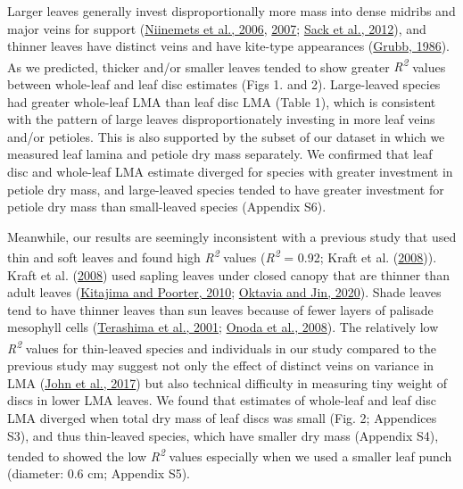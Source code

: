 \documentclass[
  12pt,
  a4paper,
,tablecaptionabove
]{scrartcl}
\begin{document}
Larger leaves generally invest disproportionally more mass into dense
midribs and major veins for support
(\protect\hyperlink{ref-Niinemets2006}{Niinemets et al., 2006},
\protect\hyperlink{ref-Niinemets2007}{2007};
\protect\hyperlink{ref-Sack2012}{Sack et al., 2012}), and thinner leaves
have distinct veins and have kite-type appearances
(\protect\hyperlink{ref-Grubb1986}{Grubb, 1986}). As we predicted,
thicker and/or smaller leaves tended to show greater
\emph{R\textsuperscript{2}} values between whole-leaf and leaf disc
estimates (Figs 1. and 2). Large-leaved species had greater whole-leaf
LMA than leaf disc LMA (Table 1), which is consistent with the pattern
of large leaves disproportionately investing in more leaf veins and/or
petioles. This is also supported by the subset of our dataset in which
we measured leaf lamina and petiole dry mass separately. We confirmed
that leaf disc and whole-leaf LMA estimate diverged for species with
greater investment in petiole dry mass, and large-leaved species tended
to have greater investment for petiole dry mass than small-leaved
species (Appendix S6).

Meanwhile, our results are seemingly inconsistent with a previous study
that used thin and soft leaves and found high
\emph{R\textsuperscript{2}} values (\emph{R\textsuperscript{2}} = 0.92;
Kraft et al. (\protect\hyperlink{ref-Kraft2008}{2008})). Kraft et al.
(\protect\hyperlink{ref-Kraft2008}{2008}) used sapling leaves under
closed canopy that are thinner than adult leaves
(\protect\hyperlink{ref-Kitajima2010}{Kitajima and Poorter, 2010};
\protect\hyperlink{ref-Oktavia2020}{Oktavia and Jin, 2020}). Shade
leaves tend to have thinner leaves than sun leaves because of fewer
layers of palisade mesophyll cells
(\protect\hyperlink{ref-Terashima2001}{Terashima et al., 2001};
\protect\hyperlink{ref-Onoda2008}{Onoda et al., 2008}). The relatively
low \emph{R\textsuperscript{2}} values for thin-leaved species and
individuals in our study compared to the previous study may suggest not
only the effect of distinct veins on variance in LMA
(\protect\hyperlink{ref-John2017}{John et al., 2017}) but also technical
difficulty in measuring tiny weight of discs in lower LMA leaves. We
found that estimates of whole-leaf and leaf disc LMA diverged when total
dry mass of leaf discs was small (Fig. 2; Appendices S3), and thus
thin-leaved species, which have smaller dry mass (Appendix S4), tended
to showed the low \emph{R\textsuperscript{2}} values especially when we
used a smaller leaf punch (diameter: 0.6 cm; Appendix S5).
\end{document}
